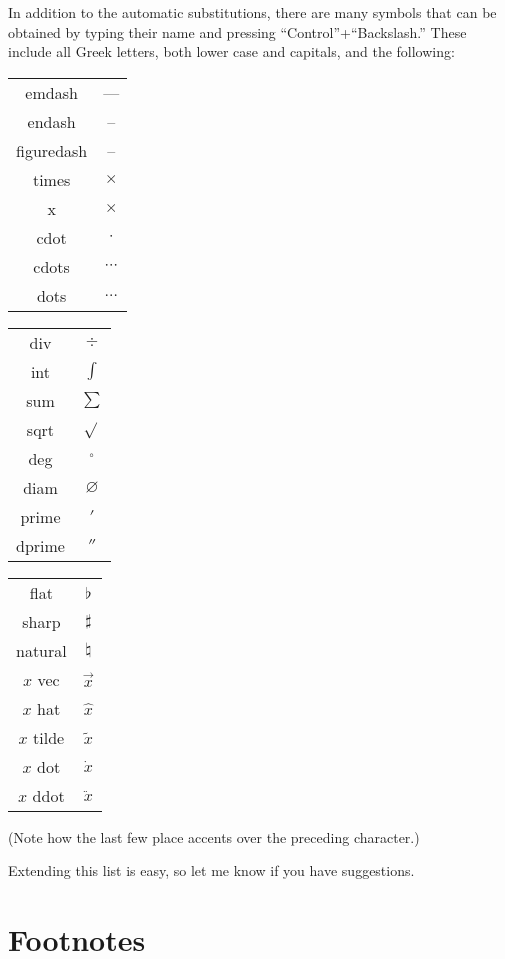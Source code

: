 \documentclass[11pt]{report}
\begin{document}
In addition to the automatic substitutions, there are many symbols
that can be obtained by typing their name and pressing
``Control''+``Backslash.'' These include all Greek letters, both
lower case and capitals, and the following:\pagebreak

\begin{multicols}{3}
\begin{tabular}{cc}
emdash & --- \\
endash & -- \\
figuredash & -- \\
times & $\times$ \\
x & $\times$ \\
cdot & $\cdot$ \\
cdots & $\cdots$ \\
dots & $\ldots$ \\
\end{tabular}

\begin{tabular}{cc}
div & $\div$ \\
int & $\int$ \\
sum & $\sum$ \\
sqrt & $\sqrt{}$ \\
deg & $^\circ$ \\
diam & $\diameter$ \\
prime & $'$ \\
dprime & $''$ 
\end{tabular}

\begin{tabular}{cc}
flat & $\flat$ \\
sharp & $\sharp$ \\
natural & $\natural$ \\
$x$ vec & $\vec x$ \\
$x$ hat & $\hat x$ \\
$x$ tilde & $\tilde x$ \\
$x$ dot & $\dot x$ \\
$x$ ddot & $\ddot x$ \\
\end{tabular}
\end{multicols}

\noindent (Note how the last few place accents over the preceding character.)

Extending this list is easy, so let me know if you have suggestions.

\section{Footnotes}
\end{document}
